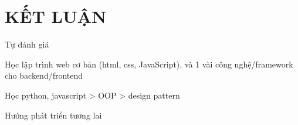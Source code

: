 \newpage
\section{KẾT LUẬN}

Tự đánh giá



Học lập trình web cơ bản     (html, css, JavaScript), và 1 vài công nghệ/framework cho backend/frontend

Học python, javascript > OOP > design pattern


Hướng phát triển tương lai